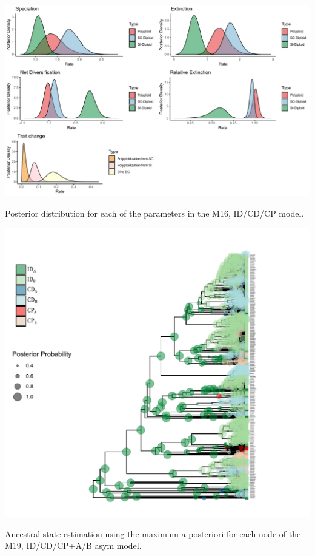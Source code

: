 \begin{suppfigure}
\includegraphics[width=\textwidth]{musseDPSInodipposteriordist.pdf}
\caption{Posterior distribution for each of the parameters in the  M16, ID/CD/CP model.} %
\label{suppfigure:IDCDCPnodip}
\end{suppfigure}

\begin{suppfigure}
\includegraphics[width=\textwidth]{asrIDCDCPAB.pdf}
\caption{Ancestral state estimation using the maximum a posteriori for each node of the  M19, ID/CD/CP+A/B asym model.} %
\label{suppfigure:IDCDCPnodipABasr}
\end{suppfigure}


